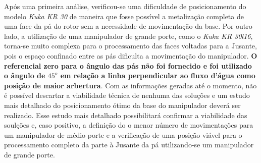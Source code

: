 Após uma primeira análise, verificou-se uma dificuldade de posicionamento do
modelo \textit{Kuka KR 30} de maneira que fosse possível a metalização completa
de uma face da pá do rotor sem a necessidade de movimentação da base. Por outro
lado, a utilização de uma manipulador de grande porte, como o \textit{Kuka KR
30l16}, torna-se muito complexa para o processamento das faces voltadas para a
Jusante, pois o espaço confinado entre as pás dificulta a movimentação do
manipulador. \textbf{O referencial zero para o ângulo das pás não foi
fornecido e foi utilizado o ângulo de $45^o$ em relação a linha perpendicular ao
fluxo d'água como posição de maior arbertura}. Com as informações geradas até o
momento, não é possível descartar a viabilidade técnica de nenhuma das soluções
e um estudo mais detalhado do posicionamento ótimo da base do manipulador deverá
ser realizado. Esse estudo mais detalhado possibilitará confirmar a viabilidade
das soulções e, caso positivo, a definição do o menor número de movimentações
para um manipulador de médio porte e a verificação de uma posição viável para
 o processamento completo da parte à Jusante da pá utilizando-se um manipulador de
grande porte.
